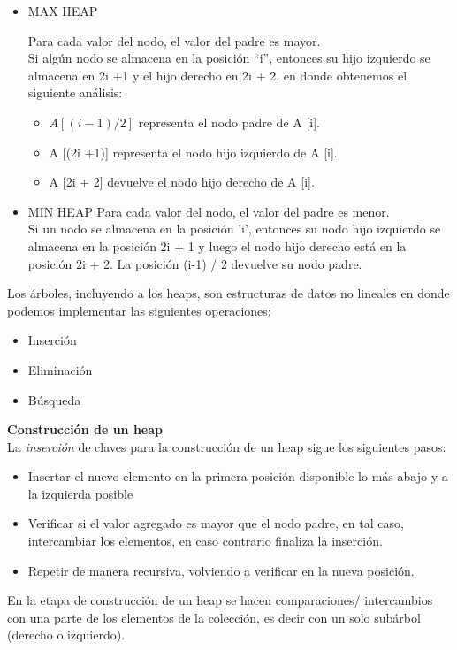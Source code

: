 \documentclass{article}
\begin{document}
\begin{itemize}
\item MAX HEAP

Para cada valor del nodo, el valor del padre es mayor.\\
Si algún nodo se almacena en la posición “i”, entonces su hijo izquierdo se almacena en 2i +1 y el hijo derecho en 2i + 2, en donde obtenemos el siguiente análisis: 
\begin{itemize}
\item $A [(i-1) / 2]$ representa el nodo padre de A [i].
\item A [(2i +1)] representa el nodo hijo izquierdo de A [i].
\item A [2i + 2] devuelve el nodo hijo derecho de A [i].
\end{itemize}
\item MIN HEAP
Para cada valor del nodo, el valor del padre es menor.\\
Si un nodo se almacena en la posición 'i', entonces su nodo hijo izquierdo se almacena en la posición 2i + 1 y luego el nodo hijo derecho está en la posición 2i + 2. 
La posición (i-1) / 2 devuelve su nodo padre.\\
\end{itemize}
Los árboles, incluyendo a los heaps, son estructuras de datos no lineales en donde podemos implementar las siguientes operaciones:
\begin{itemize}
\item Inserción
\item Eliminación
\item Búsqueda
\end{itemize}
\textbf{Construcción de un heap}\\

La \textit{inserción} de claves para la construcción de un heap sigue los siguientes pasos:
\begin{itemize}
\item Insertar el nuevo elemento en la primera posición disponible lo más abajo y a la izquierda posible
\item Verificar si el valor agregado es mayor que el nodo padre, en tal caso, intercambiar los elementos, en caso contrario finaliza la inserción.
\item Repetir de manera recursiva, volviendo a verificar en la nueva posición. 
\end{itemize}

En la etapa de construcción de un heap se hacen comparaciones/ intercambios con una parte de los elementos de la colección, es decir con un solo subárbol (derecho o izquierdo). \\
\end{document}
